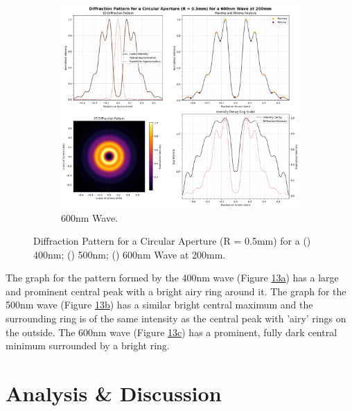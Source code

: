\documentclass[12pt]{article}
\begin{document}
\begin{figure}[H] \ContinuedFloat
    \centering
    \begin{subfigure}[b]{.48\textwidth}
        \centering
        \includegraphics[width=\linewidth]{circular_600nm.png}
        \caption{600nm Wave.}
        \label{fig:13c}
    \end{subfigure}
    \caption{Diffraction Pattern for a Circular Aperture (R = 0.5mm) for a () 400nm; () 500nm; () 600nm Wave at 200mm.}
    \label{fig:13}
\end{figure}

The graph for the pattern formed by the 400nm wave (Figure \hyperref[fig:13a]{13a}) has a large and prominent central peak with a bright airy ring around it. The graph for the 500nm wave (Figure \hyperref[fig:13b]{13b})
has a similar bright central maximum and the surrounding ring is of the same intensity as the central peak with 'airy' rings on the outside. The 600nm wave (Figure \hyperref[fig:13c]{13c}) has a prominent, fully dark central minimum surrounded by a bright
ring.

\section{Analysis \& Discussion} \label{sec:5}
\end{document}
